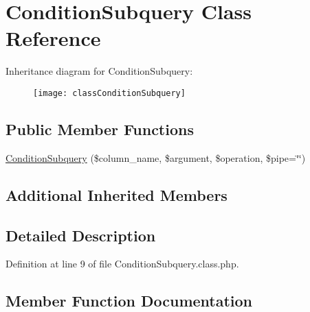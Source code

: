 \hypertarget{classConditionSubquery}{}\section{Condition\+Subquery Class Reference}
\label{classConditionSubquery}
Inheritance diagram for Condition\+Subquery\+:\begin{figure}[H]
\begin{center}
\leavevmode
\texttt{[image: classConditionSubquery]}
\end{center}
\end{figure}
\subsection*{Public Member Functions}
\begin{DoxyCompactItemize}
\item 
\hyperlink{classConditionSubquery_a5dd42cd7316837c2b63fe9b6d5703958}{Condition\+Subquery} (\$column\+\_\+name, \$argument, \$operation, \$pipe=\char`\"{}\char`\"{})
\end{DoxyCompactItemize}
\subsection*{Additional Inherited Members}


\subsection{Detailed Description}


Definition at line 9 of file Condition\+Subquery.\+class.\+php.



\subsection{Member Function Documentation}
\hypertarget{classConditionSubquery_a5dd42cd7316837c2b63fe9b6d5703958}{}
